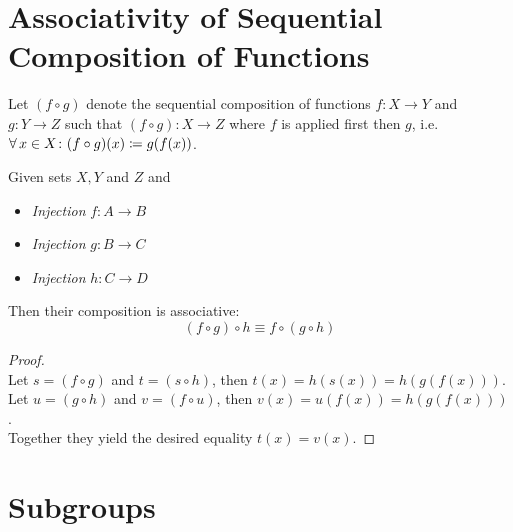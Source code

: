 \section{Associativity of Sequential Composition of Functions}

\begin{definition}
    Let $(f \circ g)$ denote the sequential composition of functions $f \colon X \to Y$ and $g \colon Y \to Z$ such that $(f \circ g) \colon X \to Z$ where $f$ is applied first then $g$, i.e. $\operatorname{\forall} x \in X \colon (f \circ g)(x) \coloneqq g(f(x))$.
\end{definition}

\begin{proposition}
    Given sets $X, Y$ and $Z$ and
    \begin{itemize}
        \item \textit{Injection} $f \colon A \to B$
        \item \textit{Injection} $g \colon B \to C$
        \item \textit{Injection} $h \colon C \to D$
    \end{itemize}
    
    Then their composition is associative:
    \begin{equation}
        (f \circ g) \circ h \equiv f \circ (g \circ h)
    \end{equation}
\end{proposition}

\begin{proof}\ \\
    Let $s = (f \circ g)$ and $t = (s \circ h)$, then $t(x) = h(s(x)) = h(g(f(x)))$.\\
    Let $u = (g \circ h)$ and $v = (f \circ u)$, then $v(x) = u(f(x)) = h(g(f(x)))$.\\ 
    Together they yield the desired equality $t(x) = v(x)$.
\end{proof}

\section{Subgroups}

